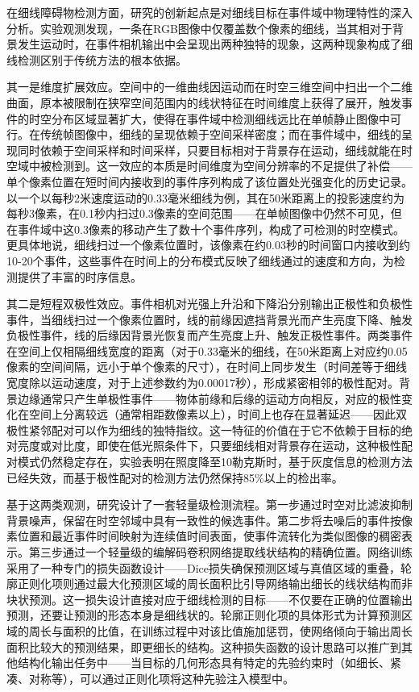 在细线障碍物检测方面，研究的创新起点是对细线目标在事件域中物理特性的深入分析。实验观测发现，一条在RGB图像中仅覆盖数个像素的细线，当其相对于背景发生运动时，在事件相机输出中会呈现出两种独特的现象，这两种现象构成了细线检测区别于传统方法的根本依据。

其一是维度扩展效应。空间中的一维曲线因运动而在时空三维空间中扫出一个二维曲面，原本被限制在狭窄空间范围内的线状特征在时间维度上获得了展开，触发事件的时空分布区域显著扩大，使得在事件域中检测细线远比在单帧静止图像中可行。在传统帧图像中，细线的呈现依赖于空间采样密度；而在事件域中，细线的呈现同时依赖于空间采样和时间采样，只要目标相对于背景存在运动，细线就能在时空域中被检测到。这一效应的本质是时间维度为空间分辨率的不足提供了补偿——单个像素位置在短时间内接收到的事件序列构成了该位置处光强变化的历史记录。以一个以每秒2米速度运动的0.33毫米细线为例，其在50米距离上的投影速度约为每秒3像素，在0.1秒内扫过0.3像素的空间范围——在单帧图像中仍然不可见，但在事件域中这0.3像素的移动产生了数十个事件序列，构成了可检测的时空模式。更具体地说，细线扫过一个像素位置时，该像素在约0.03秒的时间窗口内接收到约10-20个事件，这些事件在时间上的分布模式反映了细线通过的速度和方向，为检测提供了丰富的时序信息。

其二是短程双极性效应。事件相机对光强上升沿和下降沿分别输出正极性和负极性事件，当细线扫过一个像素位置时，线的前缘因遮挡背景光而产生亮度下降、触发负极性事件，线的后缘因背景光恢复而产生亮度上升、触发正极性事件。两类事件在空间上仅相隔细线宽度的距离（对于0.33毫米的细线，在50米距离上对应约0.05像素的空间间隔，远小于单个像素的尺寸），在时间上同步发生（时间差等于细线宽度除以运动速度，对于上述参数约为0.00017秒），形成紧密相邻的极性配对。背景边缘通常只产生单极性事件——物体前缘和后缘的运动方向相反，对应的极性变化在空间上分离较远（通常相距数像素以上），时间上也存在显著延迟——因此双极性紧邻配对可以作为细线的独特指纹。这一特征的价值在于它不依赖于目标的绝对亮度或对比度，即使在低光照条件下，只要细线相对背景存在运动，这种极性配对模式仍然稳定存在，实验表明在照度降至10勒克斯时，基于灰度信息的检测方法已经失效，而基于极性配对的检测方法仍然保持85\%以上的检出率。

基于这两类观测，研究设计了一套轻量级检测流程。第一步通过时空对比滤波抑制背景噪声，保留在时空邻域中具有一致性的候选事件。第二步将去噪后的事件按像素位置和最近事件时间映射为连续值时间表面，使事件流转化为类似图像的稠密表示。第三步通过一个轻量级的编解码卷积网络提取线状结构的精确位置。网络训练采用了一种专门的损失函数设计——Dice损失确保预测区域与真值区域的重叠，轮廓正则化项则通过最大化预测区域的周长面积比引导网络输出细长的线状结构而非块状预测。这一损失设计直接对应于细线检测的目标——不仅要在正确的位置输出预测，还要让预测的形态本身是细线状的。轮廓正则化项的具体形式为计算预测区域的周长与面积的比值，在训练过程中对该比值施加惩罚，使网络倾向于输出周长面积比较大的预测结果，即更细长的结构。这种损失函数的设计思路可以推广到其他结构化输出任务中——当目标的几何形态具有特定的先验约束时（如细长、紧凑、对称等），可以通过正则化项将这种先验注入模型中。

